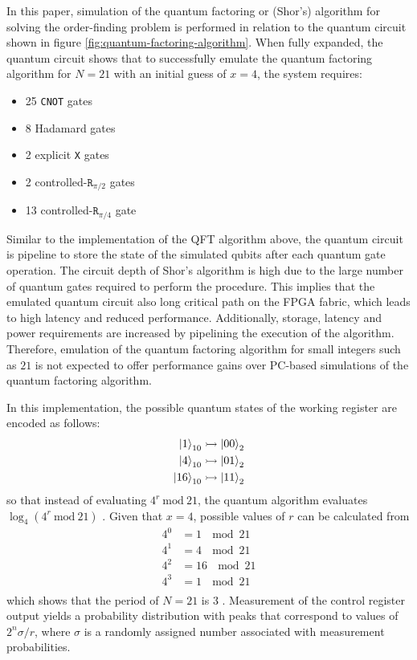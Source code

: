 In this paper, simulation of the quantum factoring or (Shor's) algorithm for solving the order-finding problem is performed in relation to the quantum circuit shown in figure \ref{fig:quantum-factoring-algorithm}. When fully expanded, the quantum circuit shows that to successfully emulate the quantum factoring algorithm for $N = 21$ with an initial guess of $x = 4$, the system requires:
\begin{itemize}
	\item 
	25 \texttt{CNOT} gates
	\item 
	8 Hadamard gates
	\item 
	2 explicit \texttt{X} gates
	\item 
	2 controlled-$\texttt{R}_{\pi/2}$ gates
	\item 
	13 controlled-$\texttt{R}_{\pi/4}$ gate
\end{itemize}
Similar to the implementation of the QFT algorithm above, the quantum circuit is pipeline to store the state of the simulated qubits after each quantum gate operation. The circuit depth of Shor's algorithm is high due to the large number of quantum gates required to perform the procedure. This implies that the emulated quantum circuit also long critical path on the FPGA fabric, which leads to high latency and reduced performance. Additionally, storage, latency and power requirements are increased by pipelining the execution of the algorithm. Therefore, emulation of the quantum factoring algorithm for small integers such as $21$ is not expected to offer performance gains over PC-based simulations of the quantum factoring algorithm. 

In this implementation, the possible quantum states of the working register are encoded as follows:
\begin{align}\label{eqn:shor-work-register}
	\ket{1}_{10} \rightarrowtail \ket{00}_{2}\nonumber\\
	\ket{4}_{10} \rightarrowtail \ket{01}_{2}\nonumber\\
	\ket{16}_{10} \rightarrowtail \ket{11}_{2}
\end{align}
so that instead of evaluating $4^r~\text{mod}~21$, the quantum algorithm evaluates $\log_4(4^r~\text{mod}~21)$ \cite{skosana2021demonstration}. Given that $x = 4$, possible values of $r$ can be calculated from
\begin{align}
	4^0	& = 1~\mod 21\nonumber\\
	4^1	& = 4~\mod 21\nonumber\\
	4^2	& = 16~\mod 21\nonumber\\
	4^3	& = 1~\mod 21\nonumber\\
\end{align}
which shows that the period of $N = 21$ is 3 \cite{skosana2021demonstration}. Measurement of the control register output yields a probability distribution with peaks that correspond to values of $2^n \sigma/r$, where $\sigma$ is a randomly assigned number associated with measurement probabilities.

